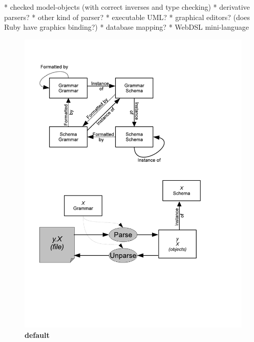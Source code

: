 \documentclass[11pt]{article}
\begin{document}
* checked model-objects (with correct inverses and type checking)
* derivative parsers?
* other kind of parser?
* executable UML?
* graphical editors?
    (does Ruby have graphics binding?)
* database mapping?
* WebDSL mini-language




\begin{figure}[htbp]
\begin{center}
\includegraphics[scale=0.8]{QuadModel.pdf}
\caption{{\bf default}}
\label{default}
\end{center}
\end{figure}
\end{document}
